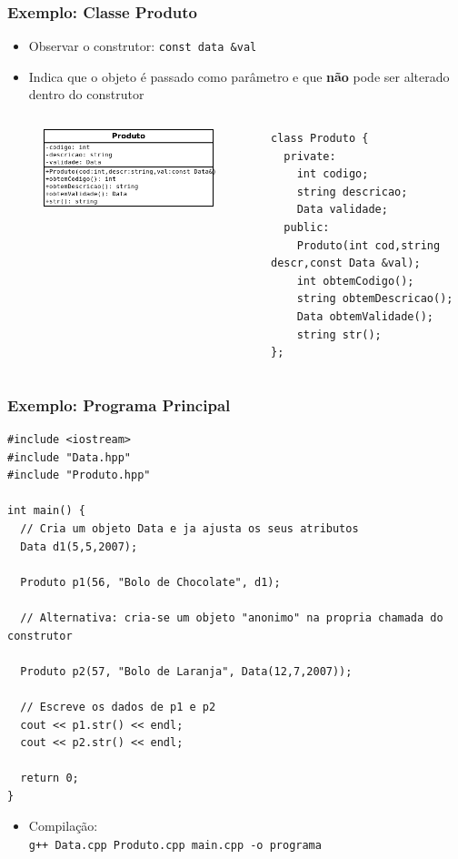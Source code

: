 \documentclass[aspectratio=169]{beamer}
\begin{document}
\begin{frame}[fragile]\frametitle{Exemplo: Classe Produto}
\begin{itemize}
	\item Observar o construtor: \texttt{const data \&val}
	\item Indica que o objeto é passado como parâmetro e que \textbf{não} pode ser alterado dentro do construtor
\end{itemize}
\begin{columns}[T]
\begin{column}{0.4\linewidth}
\begin{figure}[h]
	\centering
	\includegraphics[height=0.25\paperheight]{imagens/modelagem_produto.png}
\end{figure}
\end{column}
\begin{column}{0.6\linewidth}
\begin{lstlisting}[basicstyle=\ttfamily\scriptsize]
class Produto {
  private:
    int codigo;
    string descricao;
    Data validade;
  public:
    Produto(int cod,string descr,const Data &val);
    int obtemCodigo();
    string obtemDescricao();
    Data obtemValidade();
    string str();
};
\end{lstlisting}
\end{column}
\end{columns}
\end{frame}

\begin{frame}[fragile]\frametitle{Exemplo: Programa Principal}
\begin{lstlisting}[basicstyle=\ttfamily\tiny]
#include <iostream>
#include "Data.hpp"
#include "Produto.hpp"

int main() {
  // Cria um objeto Data e ja ajusta os seus atributos
  Data d1(5,5,2007);

  Produto p1(56, "Bolo de Chocolate", d1);

  // Alternativa: cria-se um objeto "anonimo" na propria chamada do construtor

  Produto p2(57, "Bolo de Laranja", Data(12,7,2007));

  // Escreve os dados de p1 e p2
  cout << p1.str() << endl;
  cout << p2.str() << endl;

  return 0;
}
\end{lstlisting}
\begin{itemize}
	\item Compilação:\\
	\texttt{g++ Data.cpp Produto.cpp main.cpp -o programa}
\end{itemize}
\end{frame}
\end{document}
